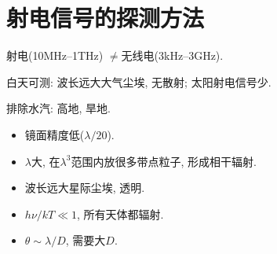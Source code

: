 \chapter{射电信号的探测方法}

射电(10MHz--1THz) $\ne$无线电(3kHz--3GHz).

白天可测: 波长远大大气尘埃, 无散射; 太阳射电信号少.

排除水汽: 高地, 旱地.

\begin{itemize}
    \item 镜面精度低($\lambda/20$).
    \item $\lambda$大, 在$\lambda^3$范围内放很多带点粒子, 形成相干辐射.
    \item 波长远大星际尘埃, 透明.
    \item $h\nu/kT\ll1$, 所有天体都辐射.
    \item $\theta\sim\lambda/D$, 需要大$D$.
\end{itemize}

